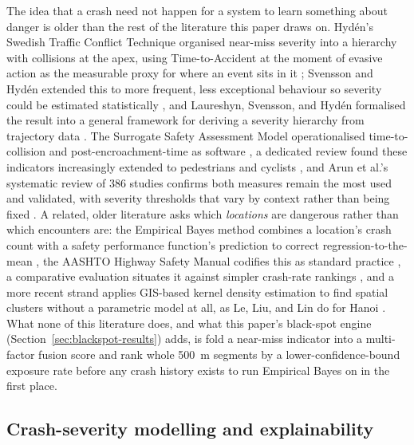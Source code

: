 \documentclass[journal]{IEEEtran}
\begin{document}
The idea that a crash need not happen for a system to learn something about danger is older than the rest of the literature this paper draws on. Hyd\'en's Swedish Traffic Conflict Technique organised near-miss severity into a hierarchy with collisions at the apex, using Time-to-Accident at the moment of evasive action as the measurable proxy for where an event sits in it \cite{hyden1987}; Svensson and Hyd\'en extended this to more frequent, less exceptional behaviour so severity could be estimated statistically \cite{svensson2006}, and Laureshyn, Svensson, and Hyd\'en formalised the result into a general framework for deriving a severity hierarchy from trajectory data \cite{laureshyn2010}. The Surrogate Safety Assessment Model operationalised time-to-collision and post-encroachment-time as software \cite{gettman2008}, a dedicated review found these indicators increasingly extended to pedestrians and cyclists \cite{johnsson2018}, and Arun et al.'s systematic review of 386 studies confirms both measures remain the most used and validated, with severity thresholds that vary by context rather than being fixed \cite{arun2021}. A related, older literature asks which \emph{locations} are dangerous rather than which encounters are: the Empirical Bayes method combines a location's crash count with a safety performance function's prediction to correct regression-to-the-mean \cite{hauer2002}, the AASHTO Highway Safety Manual codifies this as standard practice \cite{aashto2010}, a comparative evaluation situates it against simpler crash-rate rankings \cite{cheng2005}, and a more recent strand applies GIS-based kernel density estimation to find spatial clusters without a parametric model at all, as Le, Liu, and Lin do for Hanoi \cite{le2019}. What none of this literature does, and what this paper's black-spot engine (Section~\ref{sec:blackspot-results}) adds, is fold a near-miss indicator into a multi-factor fusion score and rank whole 500~m segments by a lower-confidence-bound exposure rate before any crash history exists to run Empirical Bayes on in the first place.

\subsection{Crash-severity modelling and explainability}
\end{document}

